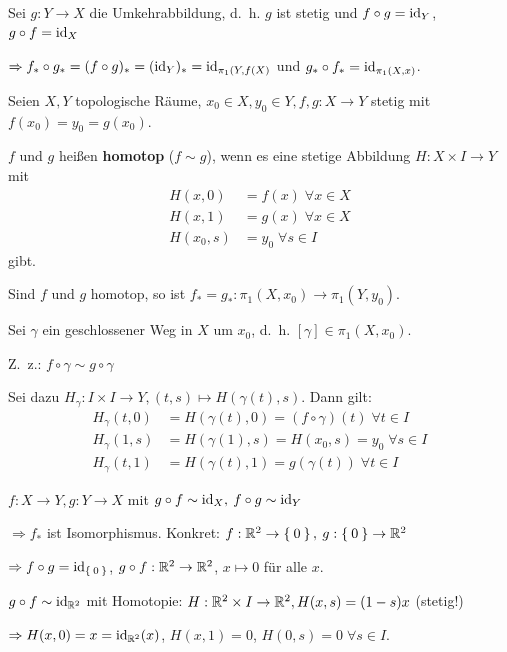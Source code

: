 \begin{beweis}
    Sei $g: Y \rightarrow X$ die Umkehrabbildung, d.~h. $g$ ist stetig
    und $f \circ g = \textnormal{id}_Y$, $g \circ f = \textnormal{id}_X$

    $\Rightarrow f_* \circ g_* = (f \circ g)_* = (\textnormal{id}_Y)_* = \textnormal{id}_{\pi_1 (Y, f(X)}$
    und $g_* \circ f_* = \textnormal{id}_{\pi_1(X,x)}$.
\end{beweis}

\begin{definition}%
    Seien $X, Y$ topologische Räume, $x_0 \in X, y_0 \in Y, f, g: X \rightarrow Y$
    stetig mit $f(x_0) = y_0 = g(x_0)$.

    $f$ und $g$ heißen \textbf{homotop} ($f \sim g$), wenn es eine stetige
    Abbildung $H: X \times I \rightarrow Y$ mit 
    \begin{align*}
        H(x,0)    &= f(x) \; \forall x \in X\\
        H(x,1)    &= g(x) \; \forall x \in X\\
        H(x_0, s) &= y_0  \; \forall s \in I
    \end{align*}
    gibt.
\end{definition}

\begin{bemerkung}
    Sind $f$ und $g$ homotop, so ist $f_* = g_*: \pi_1 (X, x_0) \rightarrow \pi_1(Y, y_0)$.
\end{bemerkung}

\begin{beweis}
    Sei $\gamma$ ein geschlossener Weg in $X$ um $x_0$, d.~h.
    $[\gamma] \in \pi_1 (X, x_0)$.

    Z.~z.: $f \circ \gamma \sim g \circ \gamma$

    Sei dazu $H_\gamma: I \times I \rightarrow Y, (t,s) \mapsto H(\gamma(t), s)$.
    Dann gilt: 
        \begin{align*}
            H_\gamma(t,0) &= H(\gamma(t), 0) = (f \circ \gamma)(t) \;\forall t \in I\\
            H_\gamma(1,s) &= H(\gamma(1), s) = H(x_0, s) = y_0\;\forall s \in I\\
            H_\gamma(t,1) &= H(\gamma(t), 1) = g(\gamma(t))\;\forall t \in I
        \end{align*}
\end{beweis}

\begin{beispiel}
    $f:X \rightarrow Y, g: Y \rightarrow X$ mit $g \circ f \sim \textnormal{id}_X,$
    $f \circ g \sim \textnormal{id}_Y$

    $\Rightarrow f_*$ ist Isomorphismus. Konkret: $f: \mathbb{R}^2 \rightarrow \Set{0},$
    $g:\Set{0} \rightarrow \mathbb{R}^2$

    $\Rightarrow f \circ g = \textnormal{id}_{\Set{0}}$, $g \circ f: \mathbb{R}^2 \rightarrow \mathbb{R}^2$,
    $x \mapsto 0$ für alle $x$.

    $g \circ f \sim \textnormal{id}_{\mathbb{R}^2}$ mit Homotopie: $H: \mathbb{R}^2 \times I \rightarrow \mathbb{R}^2, H(x,s) = (1-s) x$ (stetig!)

    $\Rightarrow H(x,0) = x = \textnormal{id}_{\mathbb{R}^2} (x)$, $H(x, 1) = 0$, $H(0, s) = 0\;\forall s \in I$.
\end{beispiel}

